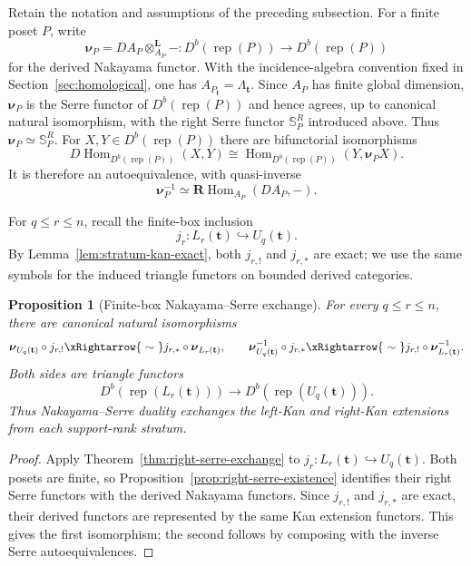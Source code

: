 \documentclass[12pt,reqno]{amsart}
\newtheorem{proposition}[theorem]{Proposition}
\theoremstyle{definition}
\theoremstyle{remark}
\newcommand{\Rep}{\operatorname{rep}}
\newcommand{\Hom}{\operatorname{Hom}}
\begin{document}
Retain the notation and assumptions of the preceding subsection.  For a
finite poset $P$, write
\[
\boldsymbol\nu_P
=
DA_P\otimes_{A_P}^{\mathbf L}-
:
D^b(\Rep(P))\longrightarrow D^b(\Rep(P))
\]
for the derived Nakayama functor.  With the incidence-algebra convention fixed
in Section~\ref{sec:homological}, one has $A_{P_{\mathbf t}}=\Lambda_{\mathbf t}$.
Since $A_P$ has finite global dimension, $\boldsymbol\nu_P$ is the Serre
functor of $D^b(\Rep(P))$ and hence agrees, up to canonical natural
isomorphism, with the right Serre functor $\mathbb S_P^R$ introduced above.
Thus $\boldsymbol\nu_P\simeq\mathbb S_P^R$.  For $X,Y\in D^b(\Rep(P))$
there are bifunctorial isomorphisms
\[
D\Hom_{D^b(\Rep(P))}(X,Y)
\cong
\Hom_{D^b(\Rep(P))}(Y,\boldsymbol\nu_P X).
\]
It is therefore an autoequivalence, with quasi-inverse
\[
\boldsymbol\nu_P^{-1}
\simeq
\mathbf R\Hom_{A_P}(DA_P,-).
\]

For $q\le r\le n$, recall the finite-box inclusion
\[
j_r:L_r(\mathbf t)\hookrightarrow U_q(\mathbf t).
\]
By Lemma~\ref{lem:stratum-kan-exact}, both $j_{r,!}$ and $j_{r,*}$ are exact;
we use the same symbols for the induced triangle functors on bounded derived
categories.

\begin{proposition}[Finite-box Nakayama--Serre exchange]\label{prop:nakayama-kan-exchange}
For every $q\le r\le n$, there are canonical natural isomorphisms
\begin{equation}\label{eq:nakayama-kan-exchange}
\boldsymbol\nu_{U_q(\mathbf t)}\circ j_{r,!}
\xRightarrow{\ \sim\ }
j_{r,*}\circ\boldsymbol\nu_{L_r(\mathbf t)},
\qquad
\boldsymbol\nu_{U_q(\mathbf t)}^{-1}\circ j_{r,*}
\xRightarrow{\ \sim\ }
j_{r,!}\circ\boldsymbol\nu_{L_r(\mathbf t)}^{-1}.
\end{equation}
Both sides are triangle functors
\[
D^b\!\left(\Rep(L_r(\mathbf t))\right)
\longrightarrow
D^b\!\left(\Rep(U_q(\mathbf t))\right).
\]
Thus Nakayama--Serre duality exchanges the left-Kan and right-Kan extensions
from each support-rank stratum.
\end{proposition}

\begin{proof}
Apply Theorem~\ref{thm:right-serre-exchange} to
$j_r:L_r(\mathbf t)\hookrightarrow U_q(\mathbf t)$.  Both posets are finite,
so Proposition~\ref{prop:right-serre-existence} identifies their right Serre
functors with the derived Nakayama functors.  Since $j_{r,!}$ and $j_{r,*}$
are exact, their derived functors are represented by the same Kan extension
functors.  This gives the first isomorphism; the second follows by composing
with the inverse Serre autoequivalences.
\end{proof}
\end{document}
